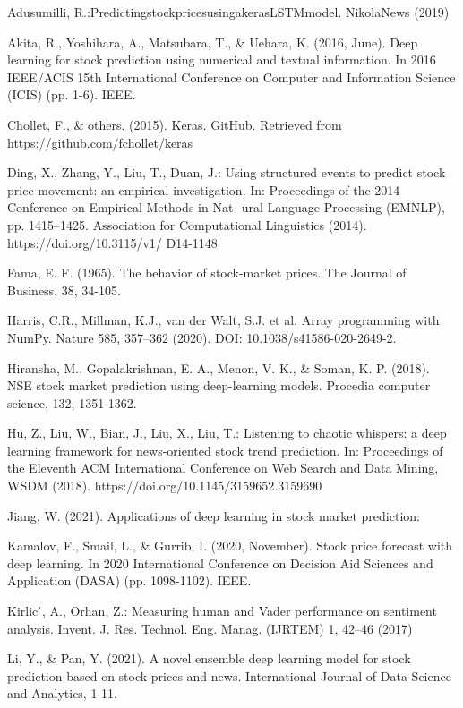 \documentclass{article}
\begin{document}
\begin{hangparas}{0.25in}{1}
Adusumilli, R.:PredictingstockpricesusingakerasLSTMmodel. NikolaNews (2019)

Akita, R., Yoshihara, A., Matsubara, T., \& Uehara, K. (2016, June). Deep learning for stock prediction using numerical and textual information. In 2016 IEEE/ACIS 15th International Conference on Computer and Information Science (ICIS) (pp. 1-6). IEEE.

Chollet, F., \& others. (2015). Keras. GitHub. Retrieved from https://github.com/fchollet/keras

Ding, X., Zhang, Y., Liu, T., Duan, J.: Using structured events to predict stock price movement: an empirical investigation. In: Proceedings of the 2014 Conference on Empirical Methods in Nat- ural Language Processing (EMNLP), pp. 1415–1425. Association for Computational Linguistics (2014). https://doi.org/10.3115/v1/ D14-1148

Fama, E. F. (1965). The behavior of stock-market prices. The Journal of Business, 38, 34-105.

Harris, C.R., Millman, K.J., van der Walt, S.J. et al. Array programming with NumPy. Nature 585, 357–362 (2020). DOI: 10.1038/s41586-020-2649-2. 

Hiransha, M., Gopalakrishnan, E. A., Menon, V. K., \& Soman, K. P. (2018). NSE stock market prediction using deep-learning models. Procedia computer science, 132, 1351-1362.

Hu, Z., Liu, W., Bian, J., Liu, X., Liu, T.: Listening to chaotic whispers: a deep learning framework for news-oriented stock trend prediction. In: Proceedings of the Eleventh ACM International Conference on Web Search and Data Mining, WSDM (2018). https://doi.org/10.1145/3159652.3159690

Jiang, W. (2021). Applications of deep learning in stock market prediction:

Kamalov, F., Smail, L., \& Gurrib, I. (2020, November). Stock price forecast with deep learning. In 2020 International Conference on Decision Aid Sciences and Application (DASA) (pp. 1098-1102). IEEE.

Kirlic ́, A., Orhan, Z.: Measuring human and Vader performance on sentiment analysis. Invent. J. Res. Technol. Eng. Manag. (IJRTEM) 1, 42–46 (2017)

Li, Y., \& Pan, Y. (2021). A novel ensemble deep learning model for stock prediction based on stock prices and news. International Journal of Data Science and Analytics, 1-11.


\end{hangparas}
\end{document}

